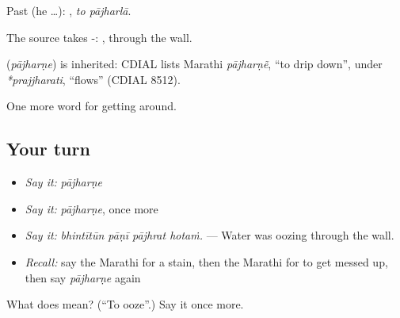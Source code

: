 Past (he …):  , \emph{to pājharlā}.

The source takes -: , through the wall.

\begin{cousinweb}
\textbf{} (\emph{pājharṇe}) is inherited: CDIAL lists Marathi \emph{pājharṇẽ}, \textquotedblleft{}to drip down\textquotedblright{}, under \emph{*prajjharati}, \textquotedblleft{}flows\textquotedblright{} (CDIAL 8512).
\end{cousinweb}

\begin{grammarlens}[title={What you've built}]
One more word for getting around.
\end{grammarlens}

\subsection*{Your turn}
\begin{itemize}
\raggedright
  \item \emph{Say it:} \emph{pājharṇe}
  \item \emph{Say it:} \emph{pājharṇe}, once more
  \item \emph{Say it:} \emph{bhintītūn pāṇī pājhrat hotaṁ.} — Water was oozing through the wall.
  \item \emph{Recall:} say the Marathi for a stain, then the Marathi for to get messed up, then say \emph{pājharṇe} again
\end{itemize}

\begin{tcolorbox}[breakable,colback=teal!4,colframe=teal!35!black,title={Before you move on}]
What does  mean? (\textquotedblleft{}To ooze\textquotedblright{}.) Say it once more.
\end{tcolorbox}
